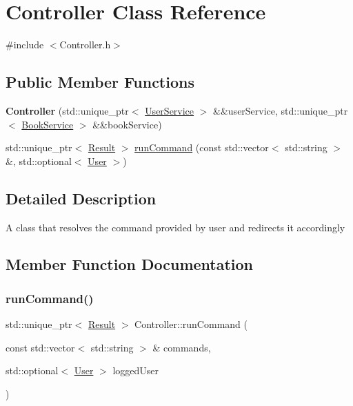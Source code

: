 \hypertarget{classController}{}\section{Controller Class Reference}
\label{classController}


{\ttfamily \#include $<$Controller.\+h$>$}

\subsection*{Public Member Functions}
\begin{DoxyCompactItemize}
\item 
\mbox{\label{classController_a0100622640979bd3c34e4ade3c091c8f}} 
{\bfseries Controller} (std\+::unique\+\_\+ptr$<$ \hyperlink{classUserService}{User\+Service} $>$ \&\&user\+Service, std\+::unique\+\_\+ptr$<$ \hyperlink{classBookService}{Book\+Service} $>$ \&\&book\+Service)
\item 
std\+::unique\+\_\+ptr$<$ \hyperlink{classResult}{Result} $>$ \hyperlink{classController_adcde0e591fc3b9e1cf74535edd35de0d}{run\+Command} (const std\+::vector$<$ std\+::string $>$ \&, std\+::optional$<$ \hyperlink{classUser}{User} $>$)
\end{DoxyCompactItemize}


\subsection{Detailed Description}
A class that resolves the command provided by user and redirects it accordingly 

\subsection{Member Function Documentation}
\mbox{\label{classController_adcde0e591fc3b9e1cf74535edd35de0d}} 
\subsubsection{\texorpdfstring{run\+Command()}{runCommand()}}
{\footnotesize\ttfamily std\+::unique\+\_\+ptr$<$ \hyperlink{classResult}{Result} $>$ Controller\+::run\+Command (\begin{DoxyParamCaption}\item[{const std\+::vector$<$ std\+::string $>$ \&}]{commands,  }\item[{std\+::optional$<$ \hyperlink{classUser}{User} $>$}]{logged\+User }\end{DoxyParamCaption})}

